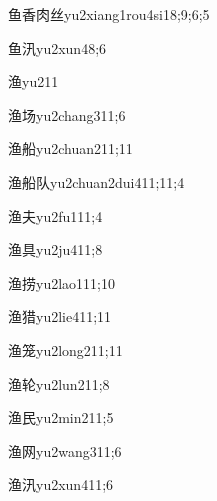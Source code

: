 \begin{verbete}{鱼香肉丝}{yu2xiang1rou4si1}{8;9;6;5}
\end{verbete}
\begin{verbete}{鱼汛}{yu2xun4}{8;6}
\end{verbete}
\begin{verbete}{渔}{yu2}{11}
\end{verbete}
\begin{verbete}{渔场}{yu2chang3}{11;6}
\end{verbete}
\begin{verbete}{渔船}{yu2chuan2}{11;11}
\end{verbete}
\begin{verbete}{渔船队}{yu2chuan2dui4}{11;11;4}
\end{verbete}
\begin{verbete}{渔夫}{yu2fu1}{11;4}
\end{verbete}
\begin{verbete}{渔具}{yu2ju4}{11;8}
\end{verbete}
\begin{verbete}{渔捞}{yu2lao1}{11;10}
\end{verbete}
\begin{verbete}{渔猎}{yu2lie4}{11;11}
\end{verbete}
\begin{verbete}{渔笼}{yu2long2}{11;11}
\end{verbete}
\begin{verbete}{渔轮}{yu2lun2}{11;8}
\end{verbete}
\begin{verbete}{渔民}{yu2min2}{11;5}
\end{verbete}
\begin{verbete}{渔网}{yu2wang3}{11;6}
\end{verbete}
\begin{verbete}{渔汛}{yu2xun4}{11;6}
\end{verbete}
